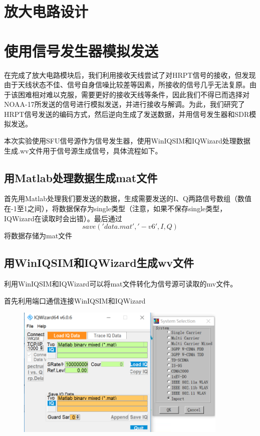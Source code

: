 \documentclass[UTF8]{ctexart}
\begin{document}
\section{放大电路设计}

\section{使用信号发生器模拟发送}

在完成了放大电路模块后，我们利用接收天线尝试了对HRPT信号的接收，但发现由于天线状态不佳、信号自身信噪比较差等因素，所接收的信号几乎无法复原。由于该困难相对难以克服，需要更好的接收天线等条件，因此我们不得已而选择对NOAA-17所发送的信号进行模拟发送，并进行接收与解调。为此，我们研究了HRPT信号发送的编码方式，然后逆向生成了发送数据，并用信号发生器和SDR模拟发送。

本次实验使用SFU信号源作为信号发生器，使用WinIQSIM和IQWizard处理数据生成.wv文件用于信号源生成信号，具体流程如下。

\subsection{用Matlab处理数据生成mat文件}

首先用Matlab处理我们要发送的数据，生成需要发送的I、Q两路信号数组（数值在-1至1之间），将数据保存为single类型（注意，如果不保存single类型，IQWizard在读取时会出错）。最后通过$$save('data.mat','-v6',I,Q)$$将数据存储为mat文件

\subsection{用WinIQSIM和IQWizard生成wv文件}

利用WinIQSIM和IQWizard可以将mat文件转化为信号源可读取的mv文件。

首先利用端口通信连接WinIQSIM和IQWizard

\begin{figure}[H]
        \centering
        \includegraphics[width=0.9\textwidth]{images//connect.png}
\end{figure}
\end{document}
